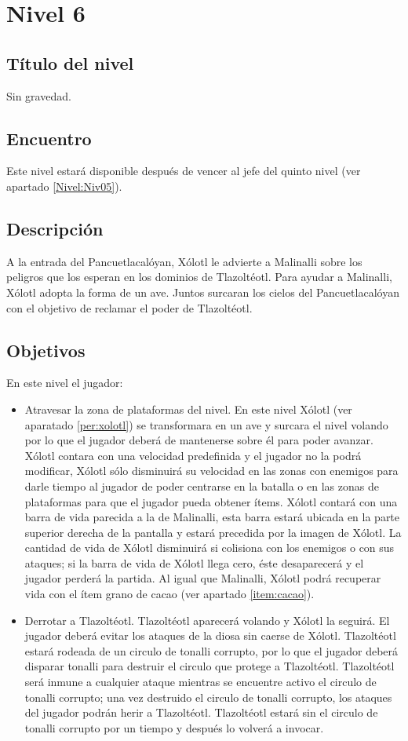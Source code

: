 	\section{Nivel 6} \label{Nivel:Niv06}
	\subsection{Título del nivel}
	Sin gravedad.
	\subsection{Encuentro}
	Este nivel estará disponible después de vencer al jefe del quinto nivel (ver apartado \ref{Nivel:Niv05}).
	\subsection{Descripción}
	A la entrada del Pancuetlacalóyan, Xólotl le advierte a Malinalli sobre los peligros que los esperan en los dominios de Tlazoltéotl. Para ayudar a Malinalli, Xólotl adopta la forma de un ave. Juntos surcaran los cielos del Pancuetlacalóyan con el objetivo de reclamar el poder de Tlazoltéotl.
	\subsection{Objetivos}
	En este nivel el jugador:
	\begin{itemize}
		\item Atravesar la zona de plataformas del nivel. En este nivel Xólotl (ver aparatado \ref{per:xolotl}) se transformara en un ave y surcara el nivel volando por lo que el jugador deberá de mantenerse sobre él para poder avanzar. Xólotl contara con una velocidad predefinida y el jugador no la podrá modificar, Xólotl sólo disminuirá su velocidad en las zonas con enemigos para darle tiempo al jugador de poder centrarse en la batalla o en las zonas de plataformas para que el jugador pueda obtener ítems. Xólotl contará con una barra de vida parecida a la de Malinalli, esta barra estará ubicada en la parte superior derecha de la pantalla y estará precedida por la imagen de Xólotl. La cantidad de vida de Xólotl disminuirá si colisiona con  los enemigos o con sus ataques; si la barra de vida de Xólotl llega cero, éste desaparecerá y el jugador perderá la partida. Al igual que Malinalli, Xólotl podrá recuperar vida con el ítem grano de cacao (ver apartado \ref{item:cacao}).
		\item Derrotar a Tlazoltéotl. Tlazoltéotl aparecerá volando y Xólotl la seguirá. El jugador deberá evitar los ataques de la diosa sin caerse de Xólotl. Tlazoltéotl estará rodeada de un circulo de tonalli corrupto, por lo que el jugador deberá disparar tonalli para destruir el circulo que protege a Tlazoltéotl. Tlazoltéotl será inmune a cualquier ataque mientras se encuentre activo el circulo de tonalli corrupto; una vez destruido el circulo de tonalli corrupto, los ataques del jugador podrán herir a Tlazoltéotl. Tlazoltéotl estará sin el circulo de tonalli corrupto por un tiempo y después lo volverá a invocar. 
	\end{itemize}	 
